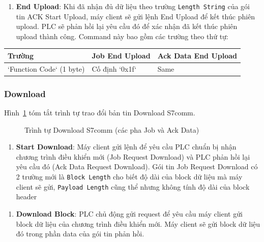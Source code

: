 \documentclass[../main.tex]{subfiles}
\begin{document}
\begin{enumerate}
    \item \textbf{End Upload}: Khi đã nhận đủ dữ liệu theo trường \texttt{Length String} của gói tin ACK Start Upload, máy client sẽ gửi lệnh End Upload để kết thúc phiên upload. PLC sẽ phản hồi lại yêu cầu đó để xác nhận đã kết thúc phiên upload thành công. Command này bao gồm các trường theo thứ tự:
\end{enumerate}


\begin{table}[H]
    \centering
    \footnotesize
    \begin{tabular}{|l|l|l|}
        \hline
        \textbf{Trường} & \textbf{Job End Upload} & \textbf{Ack Data End Upload} \\
        \hline
        `Function Code` (1 byte) & Cố định `0x1f` & Same \\
        \hline
    \end{tabular}
\end{table}


\subsubsection{Download}

Hình~\ref{fig:s7-download-sequence} tóm tắt trình tự trao đổi bản tin Download S7comm.

\begin{figure}[htbp]
    \centering
    \SSevenDownloadSequence
    \caption{Trình tự Download S7comm (các pha Job và Ack Data)}
    \label{fig:s7-download-sequence}
\end{figure}


\begin{enumerate}
    \item \textbf{Start Download}: Máy client gửi lệnh để yêu cầu PLC chuẩn bị nhận chương trình điều khiển mới (Job Request Download) và PLC phản hồi lại yêu cầu đó (Ack Data Request Download). Gói tin Job Request Download có 2 trường mới là \texttt{Block Length} cho biết độ dài của block dữ liệu mà máy client sẽ gửi, \texttt{Payload Length} cũng thể nhưng không tính độ dài của block header
\end{enumerate}



\begin{enumerate}
    \item \textbf{Download Block}: PLC chủ động gửi request để yêu cầu máy client gửi block dữ liệu của chương trình điều khiển mới. Máy client sẽ gửi block dữ liệu đó trong phần data của gói tin phản hồi.
\end{enumerate}
\end{document}

